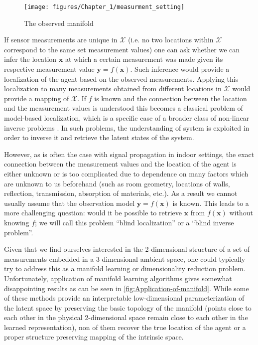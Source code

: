 	\begin{figure}[h]
		\begin{centering}
			\texttt{[image: figures/Chapter\_1/measurment\_setting]}
			\par\end{centering}
		\caption{The observed manifold\label{fig:Creation-of-observed}}
	\end{figure}
		

	If sensor measurements are unique in $\mathcal{X}$ (i.e. no two locations within $\mathcal{X}$ correspond to the same set measurement values) one can ask whether we can infer the location $\mathbf{x}$ at which a certain measurement was made given its respective measurement value $\mathbf{y}=f\left(\mathbf{x}\right)$. Such inference would provide a localization of the agent based on the observed measurements. Applying this localization to many measurements obtained from different locations in $\mathcal{X}$ would provide a mapping of $\mathcal{X}$. If $f$ is known and the connection between the location and the measurement values is understood this becomes a classical problem of model-based localization, which is a specific case of a broader class of non-linear inverse problems \cite{engl2005nonlinear}. In such problems, the understanding of system is exploited in order to inverse it and retrieve the latent states of the system.
		
	However, as is often the case with signal propagation in indoor settings, the exact connection between the measurement values and the location of the agent is either unknown or is too complicated due to dependence on many factors which are unknown to us beforehand (such as room geometry, locations of walls, reflection, transmission, absorption of materials, etc.). As a result we cannot usually assume that the observation model $\mathbf{y}=f\left(\mathbf{x}\right)$ is known. This leads to a more challenging question: would it be possible to retrieve $\mathbf{x}$ from $f\mathbf{\left(\mathbf{x}\right)}$ without knowing $f$; we will call this problem “blind localization” or a “blind inverse problem”.
		
	Given that we find ourselves interested in the 2-dimensional structure of a set of measurements embedded in a 3-dimensional ambient space, one could typically try to address this as a manifold learning or dimensionality reduction problem. Unfortunately, application of manifold learning algorithms gives somewhat disappointing results as can be seen in \cref{fig:Application-of-manifold}. While some of these methods provide an interpretable low-dimensional parameterization of the latent space by preserving the basic topology of the manifold (points close to each other in the physical 2-dimensional space remain close to each other in the learned representation), non of them recover the true location of the agent or a proper structure preserving mapping of the intrinsic space.
	
